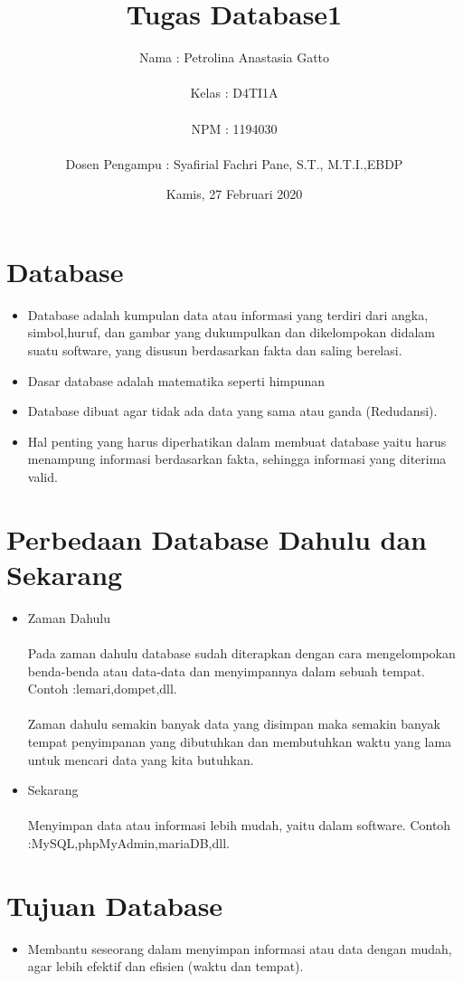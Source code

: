 \documentclass{article}
\title{Tugas Database1}
\author{Nama : Petrolina Anastasia Gatto \\ \\Kelas : D4TI1A \\ \\NPM   : 1194030 \\ \\ Dosen Pengampu : Syafirial Fachri Pane, S.T., M.T.I.,EBDP}
\date{Kamis, 27 Februari 2020}
\begin{document}
\maketitle

\section{Database}
  \begin{itemize}
      \item Database adalah kumpulan data atau informasi yang terdiri dari angka, simbol,huruf, dan gambar yang dukumpulkan dan dikelompokan didalam suatu software, yang disusun berdasarkan fakta dan saling berelasi.
      \item Dasar database adalah matematika seperti himpunan
      \item Database dibuat agar tidak ada data yang sama atau ganda (Redudansi).
      \item Hal penting yang harus diperhatikan dalam membuat database yaitu harus menampung informasi berdasarkan fakta, sehingga informasi yang diterima valid.
  \end{itemize}
      
\section{Perbedaan Database Dahulu dan Sekarang}
\begin{itemize}
    \item Zaman Dahulu
    \paragraph{}
     Pada zaman dahulu database sudah diterapkan dengan cara mengelompokan benda-benda atau data-data dan menyimpannya dalam sebuah tempat. Contoh :lemari,dompet,dll.
     \paragraph{}
     Zaman dahulu semakin banyak data yang disimpan maka semakin banyak tempat penyimpanan yang dibutuhkan dan membutuhkan waktu yang lama untuk mencari data yang kita butuhkan. 
\end{itemize}

\begin{itemize}
    \item Sekarang
    \paragraph{}
     Menyimpan data atau informasi lebih mudah, yaitu dalam software. Contoh :MySQL,phpMyAdmin,mariaDB,dll.
     
\end{itemize}

\section{Tujuan Database}
\begin{itemize}
    \item Membantu seseorang dalam menyimpan informasi atau data dengan mudah, agar lebih efektif dan efisien (waktu dan tempat).
\end{itemize}
\end{document}

